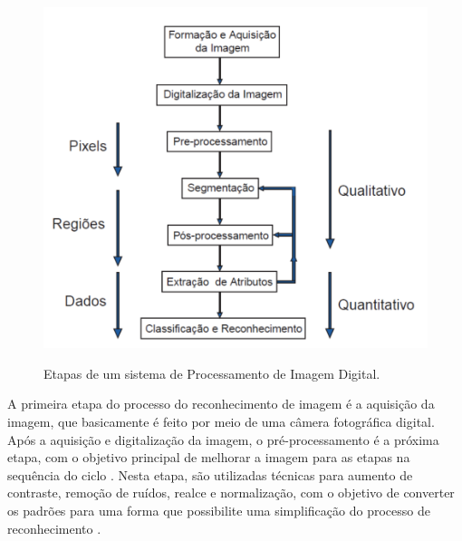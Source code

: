  \begin{figure}[h]
	\centering
	\includegraphics[width=1.0\textwidth]{Imagens/ciclogonzalesadap.png} %
	\caption[Etapas de um sistema de Processamento de Imagem Digital.]{Etapas de um sistema de Processamento de Imagem Digital. }
	\label{fig:imagem5}
\end{figure}



A primeira etapa do processo do reconhecimento de imagem é a aquisição da imagem, que basicamente é feito por meio de uma câmera fotográfica digital. Após a aquisição e digitalização da imagem, o pré-processamento é a próxima etapa, com o objetivo principal de melhorar a imagem para as etapas na sequência do ciclo \cite{GONZALEZ1992}. Nesta etapa, são utilizadas técnicas para aumento de contraste, remoção de ruídos, realce e normalização, com o objetivo de converter os padrões para uma forma que possibilite uma simplificação do processo de reconhecimento \cite{Rodrigues2002}.

